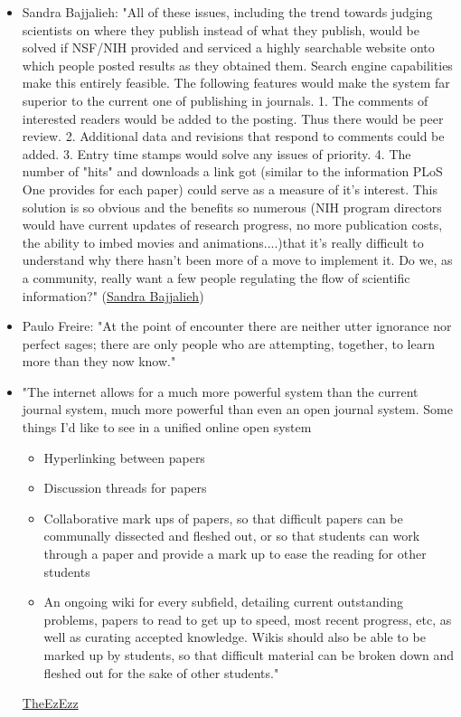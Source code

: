 \documentclass[final,authoryear,3p]{elsarticle-open-drafting}
\begin{document}
\begin{itemize}
	\item  Sandra Bajjalieh: "All of these issues, including the trend towards judging scientists on where they publish instead of what they publish, would be solved if NSF/NIH provided and serviced a highly searchable website onto which people posted results as they obtained them. Search engine capabilities make this entirely feasible. The following features would make the system far superior to the current one of publishing in journals. 1. The comments of interested readers would be added to the posting. Thus there would be peer review. 2. Additional data and revisions that respond to comments could be added. 3. Entry time stamps would solve any issues of priority. 4. The number of "hits" and downloads a link got (similar to the information PLoS One provides for each paper) could serve as a measure of it's interest. This solution is so obvious and the benefits so numerous (NIH program directors would have current updates of research progress, no more publication costs, the ability to imbed movies and animations....)that it's really difficult to understand why there hasn't been more of a move to implement it. Do we, as a community, really want a few people regulating the flow of scientific information?" (\href{http://www.nature.com/news/2011/110427/full/472391a.html}{Sandra Bajjalieh})
	
	\item  Paulo Freire: "At the point of encounter there are neither utter ignorance nor perfect sages; there are only people who are attempting, together, to learn more than they now know." 
	
	\item "The internet allows for a much more powerful system than the current journal system, much more powerful than even an open journal system.
Some things I'd like to see in a unified online open system
	\begin{itemize}

    \item Hyperlinking between papers
    \item Discussion threads for papers
    \item Collaborative mark ups of papers, so that difficult papers can be communally dissected and fleshed out, or so that students can work through a paper and provide a mark up to ease the reading for other students
    \item An ongoing wiki for every subfield, detailing current outstanding problems, papers to read to get up to speed, most recent progress, etc, as well as curating accepted knowledge. Wikis should also be able to be marked up by students, so that difficult material can be broken down and fleshed out for the sake of other students." 
    \end{itemize}
    \href{http://news.ycombinator.com/item?id=1972586}{TheEzEzz}


\end{itemize}
\end{document}
